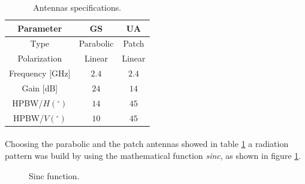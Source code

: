 \begin{table}[h]
	\centering
	\begin{tabular}{|c||c|c|}
		\hline
		Parameter & GS & UA\\ \hline\hline
		Type & Parabolic & Patch\\ \hline
		Polarization & Linear & Linear\\ \hline
		Frequency [GHz] & $2.4$ & $2.4$\\ \hline
		Gain [dB] & $24$ & $14$\\ \hline
		HPBW/$H(^{\circ})$ & $14$ & $45$\\ \hline
		HPBW/$V(^{\circ})$ & $10$ & $45$\\ \hline
	\end{tabular}
	\caption{Antennas specifications.}
	\label{table:1}
\end{table}

\paragraph{}Choosing the parabolic and the patch antennas showed in table \ref{table:1} a radiation pattern was build by using the mathematical function \textit{sinc}, as shown in figure \ref{fig:sinc}.

\begin{figure}[H]
\hfill
{}
\hfill
{}
\hfill
\caption{Sinc function.}
\label{fig:sinc}
\end{figure}

